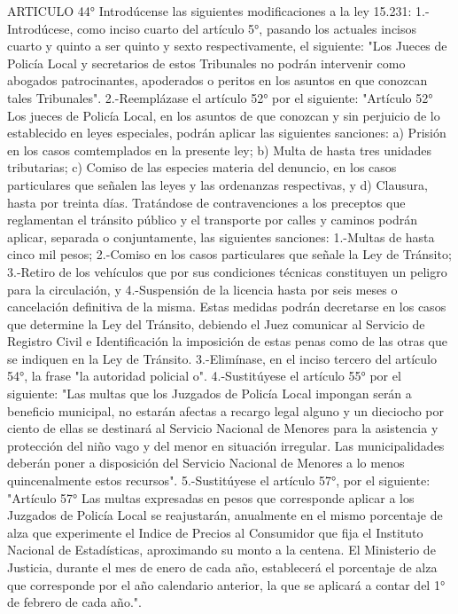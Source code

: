     ARTICULO 44° Introdúcense las siguientes modificaciones a la ley 15.231:
    1.-Introdúcese, como inciso cuarto del artículo 5°, pasando los actuales incisos cuarto y quinto a ser quinto y sexto respectivamente, el siguiente:
    "Los Jueces de Policía Local y secretarios de estos Tribunales no podrán intervenir como abogados patrocinantes, apoderados o peritos en los asuntos en que conozcan tales Tribunales".
    2.-Reemplázase el artículo 52° por el siguiente:
    "Artículo 52° Los jueces de Policía Local, en los asuntos de que conozcan y sin perjuicio de lo establecido en leyes especiales, podrán aplicar las siguientes sanciones:
    a) Prisión en los casos comtemplados en la presente ley;
    b) Multa de hasta tres unidades tributarias;
    c) Comiso de las especies materia del denuncio, en los casos particulares que señalen las leyes y las ordenanzas respectivas, y
    d) Clausura, hasta por treinta días.
    Tratándose de contravenciones a los preceptos que reglamentan el tránsito público y el transporte por calles y caminos podrán aplicar, separada o conjuntamente, las siguientes sanciones:
    1.-Multas de hasta cinco mil pesos;
    2.-Comiso en los casos particulares que señale la Ley de Tránsito;
    3.-Retiro de los vehículos que por sus condiciones técnicas constituyen un peligro para la circulación, y 4.-Suspensión de la licencia hasta por seis meses o cancelación definitiva de la misma. Estas medidas podrán decretarse en los casos que determine la Ley del Tránsito, debiendo el Juez comunicar al Servicio de Registro Civil e Identificación la imposición de estas penas como de las otras que se indiquen en la Ley de Tránsito.
    3.-Elimínase, en el inciso tercero del artículo 54°, la frase "la autoridad policial o".
    4.-Sustitúyese el artículo 55° por el siguiente:
    "Las multas que los Juzgados de Policía Local impongan serán a beneficio municipal, no estarán afectas a recargo legal alguno y un dieciocho por ciento de ellas se destinará al Servicio Nacional de Menores para la asistencia y protección del niño vago y del menor en situación irregular. Las municipalidades deberán poner a disposición del Servicio Nacional de Menores a lo menos quincenalmente estos recursos".
    5.-Sustitúyese el artículo 57°, por el siguiente:
    "Artículo 57° Las multas expresadas en pesos que corresponde aplicar a los Juzgados de Policía Local se reajustarán, anualmente en el mismo porcentaje de alza que experimente el Indice de Precios al Consumidor que fija el Instituto Nacional de Estadísticas, aproximando su monto a la centena.
    El Ministerio de Justicia, durante el mes de enero de cada año, establecerá el porcentaje de alza que corresponde por el año calendario anterior, la que se aplicará a contar del 1° de febrero de cada año.".
